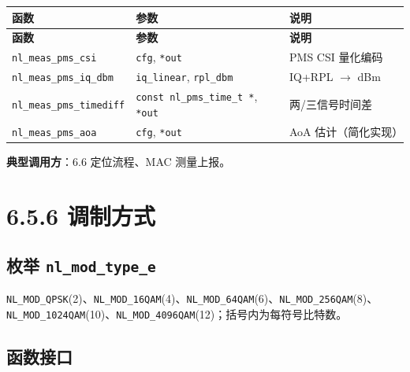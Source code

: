 \documentclass[11pt,a4paper]{ctexart}
\begin{document}
\begin{longtable}{@{}L{4.2cm}L{5.5cm}L{4.8cm}@{}}
\toprule
\textbf{函数} & \textbf{参数} & \textbf{说明} \\
\midrule
\endfirsthead
\toprule\textbf{函数}&\textbf{参数}&\textbf{说明}\\\midrule\endhead
\texttt{nl\_meas\_pms\_csi} & \texttt{cfg}, \texttt{*out} & PMS CSI 量化编码 \\
\texttt{nl\_meas\_pms\_iq\_dbm} & \texttt{iq\_linear}, \texttt{rpl\_dbm} & IQ+RPL $\rightarrow$ dBm \\
\texttt{nl\_meas\_pms\_timediff} & \texttt{const nl\_pms\_time\_t *}, \texttt{*out} & 两/三信号时间差 \\
\texttt{nl\_meas\_pms\_aoa} & \texttt{cfg}, \texttt{*out} & AoA 估计（简化实现） \\
\bottomrule
\end{longtable}

\textbf{典型调用方}：6.6 定位流程、MAC 测量上报。

\newpage
\section{6.5.6 调制方式}

\subsection{枚举 \texttt{nl\_mod\_type\_e}}

\texttt{NL\_MOD\_QPSK}(2)、\texttt{NL\_MOD\_16QAM}(4)、\texttt{NL\_MOD\_64QAM}(6)、\texttt{NL\_MOD\_256QAM}(8)、\texttt{NL\_MOD\_1024QAM}(10)、\texttt{NL\_MOD\_4096QAM}(12)；括号内为每符号比特数。

\subsection{函数接口}
\end{document}
